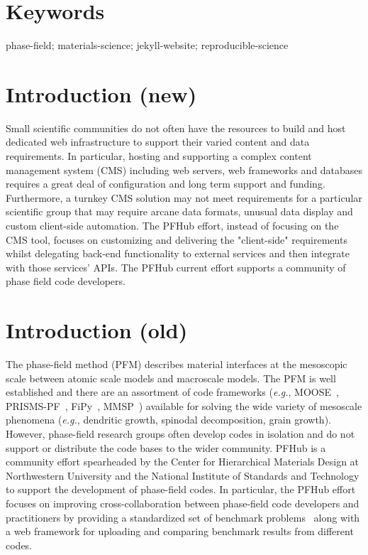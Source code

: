 \documentclass{jors}
\begin{document}
\section*{Keywords}

phase-field; materials-science; jekyll-website; reproducible-science

\section*{Introduction (new)}

Small scientific communities do not often have the resources to build
and host dedicated web infrastructure to support their varied content
and data requirements. In particular, hosting and supporting a complex
content management system (CMS) including web servers, web frameworks
and databases requires a great deal of configuration and long term
support and funding. Furthermore, a turnkey CMS solution may not meet
requirements for a particular scientific group that may require arcane
data formats, unusual data display and custom client-side automation.
The PFHub effort, instead of focusing on the CMS tool, focuses on
customizing and delivering the "client-side" requirements whilst
delegating back-end functionality to external services and then
integrate with those services' APIs. The PFHub current effort supports
a community of phase field code developers.

\section*{Introduction (old)}

The phase-field method (PFM) describes material interfaces at the
mesoscopic scale between atomic scale models and macroscale models.
The PFM is well established and there are an assortment of code
frameworks (\emph{e.g.}, MOOSE~\cite{moose},
PRISMS-PF~\cite{prisms-pf}, FiPy~\cite{fipy},
MMSP~\cite{mmsp}) available for
solving the wide variety of mesoscale phenomena (\emph{e.g.},
dendritic growth, spinodal decomposition, grain growth). However,
phase-field research groups often develop codes in isolation and do
not support or distribute the code bases to the wider community. PFHub
is a community effort spearheaded by the Center for Hierarchical
Materials Design at Northwestern University and the National Institute
of Standards and Technology to support the development of phase-field
codes. In particular, the PFHub effort focuses on improving
cross-collaboration between phase-field code developers and
practitioners by providing a standardized set of benchmark
problems~\cite{bm1, bm2} along with a web framework for uploading and
comparing benchmark results from different codes.
\end{document}
